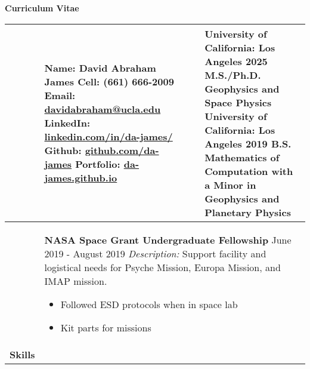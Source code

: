 \documentclass[10pt]{article}
\newcommand*\leftright[2]{%
  \leavevmode
  \rlap{#1}%
  \hspace{0.5\linewidth}%
  #2}
\begin{document}
{\centering
    \textbf{\large Curriculum Vitae} \\
}
\begin{longtable}{l l l l} \hline
    \multicolumn{1}{p{1.7 cm}}{\textbf{\vspace{Contact Info.}}}    &    
    
        \multicolumn{1}{p{7cm}}{
        \textbf{Name:} David Abraham James \newline
        \textbf{Cell: } (661) 666-2009 \newline
        \textbf{Email: } \href{mailto:davidabraham@ucla.edu}{davidabraham@ucla.edu} \newline
        \textbf{LinkedIn: } \href{https://www.linkedin.com/in/da-james/}{linkedin.com/in/da-james/} \newline
        \textbf{Github: } \href{https://github.com/da-james}{github.com/da-james} \newline
        \textbf{Portfolio: } \href{https://da-james.github.io}{da-james.github.io}} &
        \multicolumn{1}{p{1.5cm}}{\textbf{\vspace{Education}}}  &
            \multicolumn{1}{p{7.4cm}}{
            \textbf{University of California: Los Angeles 2025} \newline
            M.S./Ph.D. Geophysics and Space Physics \newline
            \textbf{University of California: Los Angeles 2019} \newline
            B.S. Mathematics of Computation  with a \newline
            Minor in Geophysics and Planetary Physics} \\ \hline

    \multicolumn{1}{p{1.7cm}}{
    \textbf{\vspace{Awards}}}    &                
    
        \multicolumn{3}{p{17cm}}{
        \textbf{NASA Space Grant Undergraduate Fellowship} \newline
        \leftright{\textit{Lab Assistant}}{June 2019 - August 2019} \newline
        \textit{Description:} Support facility and logistical needs for Psyche Mission, Europa Mission, and IMAP mission.
        \begin{itemize}[noitemsep,nolistsep]
            \item Followed ESD protocols when in space lab
            \item Kit parts for missions
        \end{itemize}
       \baselineskip } \\ \hline
    \multicolumn{1}{p{1.7cm}}{\textbf{Skills}}   &
    

\end{longtable}
\end{document}
